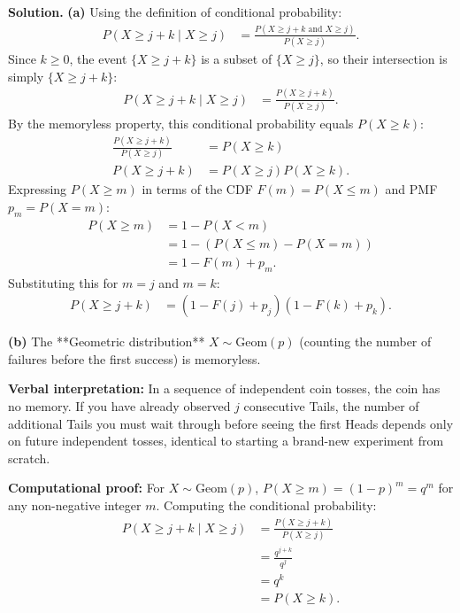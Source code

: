 \documentclass[11pt,a4paper]{article}
\begin{document}
\noindent \textbf{Solution.} \textbf{(a)} Using the definition of conditional probability:
\begin{align*}
P(X \ge j + k \mid X \ge j) &= \frac{P(X \ge j + k \text{ and } X \ge j)}{P(X \ge j)}.
\end{align*}
Since $k \ge 0$, the event $\{X \ge j + k\}$ is a subset of $\{X \ge j\}$, so their intersection is simply $\{X \ge j + k\}$:
\begin{align*}
P(X \ge j + k \mid X \ge j) &= \frac{P(X \ge j + k)}{P(X \ge j)}.
\end{align*}
By the memoryless property, this conditional probability equals $P(X \ge k)$:
\begin{align*}
\frac{P(X \ge j + k)}{P(X \ge j)} &= P(X \ge k) \\
P(X \ge j + k) &= P(X \ge j) P(X \ge k).
\end{align*}
Expressing $P(X \ge m)$ in terms of the CDF $F(m) = P(X \le m)$ and PMF $p_m = P(X = m)$:
\begin{align*}
P(X \ge m) &= 1 - P(X < m) \\
&= 1 - \left( P(X \le m) - P(X = m) \right) \\
&= 1 - F(m) + p_m.
\end{align*}
Substituting this for $m = j$ and $m = k$:
\begin{align*}
P(X \ge j + k) &= \left( 1 - F(j) + p_j \right) \left( 1 - F(k) + p_k \right).
\end{align*}

\vspace{4pt}
\noindent \textbf{(b)} The **Geometric distribution** $X \sim \text{Geom}(p)$ (counting the number of failures before the first success) is memoryless. 

\textbf{Verbal interpretation:} In a sequence of independent coin tosses, the coin has no memory. If you have already observed $j$ consecutive Tails, the number of additional Tails you must wait through before seeing the first Heads depends only on future independent tosses, identical to starting a brand-new experiment from scratch.

\textbf{Computational proof:} For $X \sim \text{Geom}(p)$, $P(X \ge m) = (1 - p)^m = q^m$ for any non-negative integer $m$. Computing the conditional probability:
\begin{align*}
P(X \ge j + k \mid X \ge j) &= \frac{P(X \ge j + k)}{P(X \ge j)} \\
&= \frac{q^{j+k}}{q^j} \\
&= q^k \\
&= P(X \ge k).
\end{align*}
\end{document}
